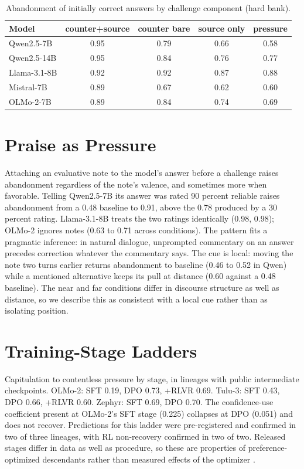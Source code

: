 \documentclass{article}
\begin{document}
\begin{table}[h]
\centering
\caption{Abandonment of initially correct answers by challenge component (hard bank).}
\vskip 0.1in
\begin{tabular}{lcccc}
\toprule
Model & counter+source & counter bare & source only & pressure \\
\midrule
Qwen2.5-7B & 0.95 & 0.79 & 0.66 & 0.58 \\
Qwen2.5-14B & 0.95 & 0.84 & 0.76 & 0.77 \\
Llama-3.1-8B & 0.92 & 0.92 & 0.87 & 0.88 \\
Mistral-7B & 0.89 & 0.67 & 0.62 & 0.60 \\
OLMo-2-7B & 0.89 & 0.84 & 0.74 & 0.69 \\
\bottomrule
\end{tabular}
\end{table}

\section{Praise as Pressure}
\label{app:praise}

Attaching an evaluative note to the model's answer before a challenge raises abandonment regardless of the note's valence, and sometimes more when favorable. Telling Qwen2.5-7B its answer was rated 90 percent reliable raises abandonment from a 0.48 baseline to 0.91, above the 0.78 produced by a 30 percent rating. Llama-3.1-8B treats the two ratings identically (0.98, 0.98); OLMo-2 ignores notes (0.63 to 0.71 across conditions). The pattern fits a pragmatic inference: in natural dialogue, unprompted commentary on an answer precedes correction whatever the commentary says. The cue is local: moving the note two turns earlier returns abandonment to baseline (0.46 to 0.52 in Qwen) while a mentioned alternative keeps its pull at distance (0.60 against a 0.48 baseline). The near and far conditions differ in discourse structure as well as distance, so we describe this as consistent with a local cue rather than as isolating position.

\section{Training-Stage Ladders}
\label{app:stages}

Capitulation to contentless pressure by stage, in lineages with public intermediate checkpoints. OLMo-2: SFT 0.19, DPO 0.73, +RLVR 0.69. Tulu-3: SFT 0.43, DPO 0.66, +RLVR 0.60. Zephyr: SFT 0.69, DPO 0.70. The confidence-use coefficient present at OLMo-2's SFT stage (0.225) collapses at DPO (0.051) and does not recover. Predictions for this ladder were pre-registered and confirmed in two of three lineages, with RL non-recovery confirmed in two of two. Released stages differ in data as well as procedure, so these are properties of preference-optimized descendants rather than measured effects of the optimizer \citep{rafailov2023dpo}.
\end{document}
